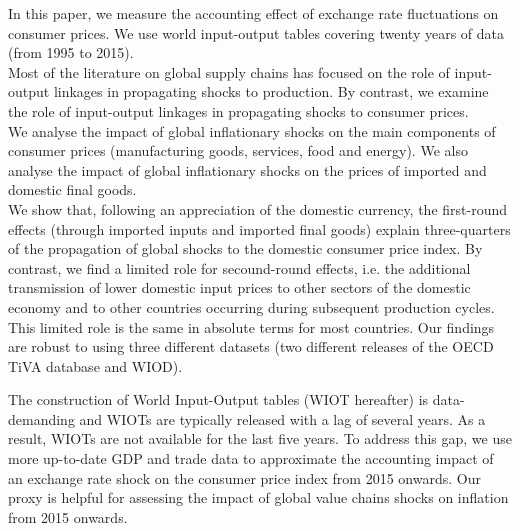 \documentclass[11pt,a4paper]{article}
\begin{document}
In this paper, we measure the accounting effect of exchange rate fluctuations on consumer prices. We use world input-output tables covering twenty years of data (from 1995 to 2015).\\
Most of the literature on global supply chains has focused on the role of input-output linkages in propagating shocks to production.
By contrast, we examine the role of input-output linkages in propagating shocks to consumer prices.\\
We analyse the impact of global inflationary shocks on the main components of consumer prices (manufacturing goods, services, food and energy). 
We also analyse the impact of global inflationary shocks on the prices of imported and domestic final goods. \\
We show that, following an appreciation of the domestic currency, the first-round effects (through imported inputs and imported final goods) explain three-quarters of the propagation of global shocks to the domestic consumer price index. 
By contrast, we find a limited role for secound-round effects, i.e. the additional transmission of lower domestic input prices to other sectors of the domestic economy and to other countries occurring during subsequent production cycles.
This limited role is the same in absolute terms for most countries.
Our findings are robust to using three different datasets (two different releases of the OECD TiVA database and WIOD).

The construction of World Input-Output tables (WIOT hereafter) is data-demanding and WIOTs are typically released with a lag of several years.
As a result, WIOTs are not available for the last five years.
To address this gap, we use more up-to-date GDP and trade data to approximate the accounting impact of an exchange rate shock on the consumer price index from 2015 onwards.
Our proxy is helpful for assessing the impact of global value chains shocks on inflation from 2015 onwards.


\end{document}
